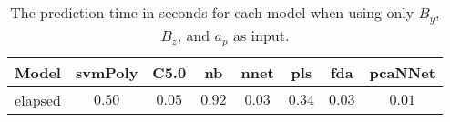 \begin{table}[!ht]
	\centering
	\begin{tabular}{|c|c|c|c|c|c|c|c|}
		\hline
		Model & svmPoly & C5.0 & nb & nnet & pls & fda & pcaNNet \\ \hline
		elapsed & $0.50$ & $0.05$ & $0.92$ & $0.03$ & $0.34$ & $0.03$ & $0.01$ \\ \hline
	\end{tabular}
	\caption{The prediction time in seconds for each model when using only $B_{y}$, $B_{z}$, and $a_{p}$ as input.}
	\label{tab:time:reverse:yzap:predict}
\end{table}
